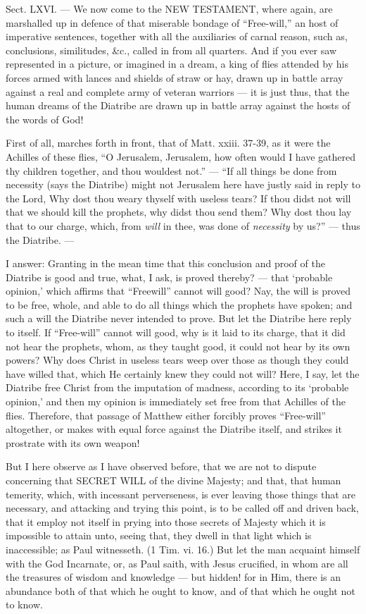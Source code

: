 
Sect. LXVI. — We now come to the \textsc{NEW TESTAMENT}, where again, are marshalled up in defence of that miserable bondage of “Free-will,” an host of imperative sentences, together with all the auxiliaries of carnal reason, such as, conclusions, similitudes, \&c., called in from all quarters. And if you ever saw represented in a picture, or imagined in a dream, a king of flies attended by his forces armed with lances and shields of straw or hay, drawn up in battle array against a real and complete army of veteran warriors — it is just thus, that the human dreams of the Diatribe are drawn up in battle array against the hosts of the words of God!

First of all, marches forth in front, that of Matt. xxiii. 37-39, as it were the Achilles of these flies, “O Jerusalem, Jerusalem, how often would I have gathered thy children together, and thou wouldest not.” — “If all things be done from necessity (says the Diatribe) might not Jerusalem here have justly said in reply to the Lord, Why dost thou weary thyself with useless tears? If thou didst not will that we should kill the prophets, why didst thou send them? Why dost thou lay that to our charge, which, from \emph{will }in thee, was done of \emph{necessity }by us?” — thus the Diatribe. —

I answer: Granting in the mean time that this conclusion and proof of the Diatribe is good and true, what, I ask, is proved thereby? — that ‘probable opinion,’ which affirms that “Freewill” cannot will good? Nay, the will is proved to be free, whole, and able to do all things which the prophets have spoken; and such a will the Diatribe never intended to prove. But let the Diatribe here reply to itself. If “Free-will” cannot will good, why is it laid to its charge, that it did not hear the prophets, whom, as they taught good, it could not hear by its own powers? Why does Christ in useless tears weep over those as though they could have willed that, which He certainly knew they could not will? Here, I say, let the Diatribe free Christ from the imputation of madness, according to its ‘probable opinion,’ and then my opinion is immediately set free from that Achilles of the flies. Therefore, that passage of Matthew either forcibly proves “Free-will” altogether, or makes with equal force against the Diatribe itself, and strikes it prostrate with its own weapon!

But I here observe as I have observed before, that we are not to dispute concerning that \textsc{SECRET WILL} of the divine Majesty; and that, that human temerity, which, with incessant perverseness, is ever leaving those things that are necessary, and attacking and trying this point, is to be called off and driven back, that it employ not itself in prying into those secrets of Majesty which it is impossible to attain unto, seeing that, they dwell in that light which is inaccessible; as Paul witnesseth. (1 Tim. vi. 16.) But let the man acquaint himself with the God Incarnate, or, as Paul saith, with Jesus crucified, in whom are all the treasures of wisdom and knowledge — but hidden! for in Him, there is an abundance both of that which he ought to know, and of that which he ought not to know.

